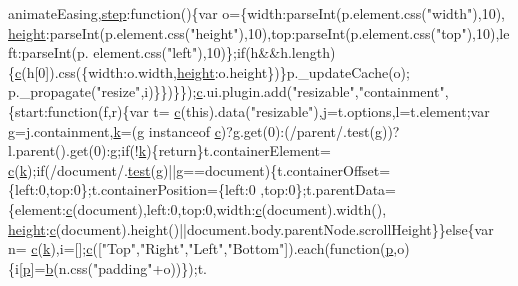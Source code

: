 \begin{DoxyCode}
      animateEasing,\hyperlink{over__hinder_8c_a863c86bdfd96bf9c461846689c2614aa}{step}:\textcolor{keyword}{function}()\{var o=\{width:parseInt(p.element.css(\textcolor{stringliteral}{"width"}),10),
      \hyperlink{styr_2styr_2main_8c_a48083b65ac9a863566dc3e3fff09a5b4}{height}:parseInt(p.element.css(\textcolor{stringliteral}{"height"}),10),top:parseInt(p.element.css(\textcolor{stringliteral}{"top"}),10),left:parseInt(p.
      element.css(\textcolor{stringliteral}{"left"}),10)\};\textcolor{keywordflow}{if}(h&&h.length)\{\hyperlink{jquery_8js_ad171626e81625b5e9f5cb177a3a8fb1c}{c}(h[0]).css(\{width:o.width,\hyperlink{styr_2styr_2main_8c_a48083b65ac9a863566dc3e3fff09a5b4}{height}:o.height\})\}p.\_updateCache(o);
      p.\_propagate(\textcolor{stringliteral}{"resize"},i)\}\})\}\});\hyperlink{jquery_8js_ad171626e81625b5e9f5cb177a3a8fb1c}{c}.ui.plugin.add(\textcolor{stringliteral}{"resizable"},\textcolor{stringliteral}{"containment"},\{start:\textcolor{keyword}{function}(f,r)\{var t=
      \hyperlink{jquery_8js_ad171626e81625b5e9f5cb177a3a8fb1c}{c}(\textcolor{keyword}{this}).data(\textcolor{stringliteral}{"resizable"}),j=t.options,l=t.element;var g=j.containment,\hyperlink{jquery_8js_ab26645c014aa005ecedef329ecf58c99}{k}=(g instanceof 
      \hyperlink{jquery_8js_ad171626e81625b5e9f5cb177a3a8fb1c}{c})?g.get(0):(/parent/.test(g))?l.parent().get(0):g;\textcolor{keywordflow}{if}(!\hyperlink{jquery_8js_ab26645c014aa005ecedef329ecf58c99}{k})\{\textcolor{keywordflow}{return}\}t.containerElement=
      \hyperlink{jquery_8js_ad171626e81625b5e9f5cb177a3a8fb1c}{c}(\hyperlink{jquery_8js_ab26645c014aa005ecedef329ecf58c99}{k});\textcolor{keywordflow}{if}(/document/.\hyperlink{inv__mpu_8c_a1e8f8b1ef7fb2c429e1ce7c2f9985530}{test}(g)||g==document)\{t.containerOffset=\{left:0,top:0\};t.containerPosition=\{left:0
      ,top:0\};t.parentData=\{element:\hyperlink{jquery_8js_ad171626e81625b5e9f5cb177a3a8fb1c}{c}(document),left:0,top:0,width:\hyperlink{jquery_8js_ad171626e81625b5e9f5cb177a3a8fb1c}{c}(document).width(),
      \hyperlink{styr_2styr_2main_8c_a48083b65ac9a863566dc3e3fff09a5b4}{height}:\hyperlink{jquery_8js_ad171626e81625b5e9f5cb177a3a8fb1c}{c}(document).height()||document.body.parentNode.scrollHeight\}\}\textcolor{keywordflow}{else}\{var n=
      \hyperlink{jquery_8js_ad171626e81625b5e9f5cb177a3a8fb1c}{c}(\hyperlink{jquery_8js_ab26645c014aa005ecedef329ecf58c99}{k}),i=[];\hyperlink{jquery_8js_ad171626e81625b5e9f5cb177a3a8fb1c}{c}([\textcolor{stringliteral}{"Top"},\textcolor{stringliteral}{"Right"},\textcolor{stringliteral}{"Left"},\textcolor{stringliteral}{"Bottom"}]).each(\textcolor{keyword}{function}(\hyperlink{jquery_8js_a2335e57f79b6acfb6de59c235dc8a83e}{p},o)\{i[\hyperlink{jquery_8js_a2335e57f79b6acfb6de59c235dc8a83e}{p}]=\hyperlink{jquery_8js_aa4026ad5544b958e54ce5e106fa1c805}{b}(n.css(\textcolor{stringliteral}{"padding"}+o))\});t.

\end{DoxyCode}
